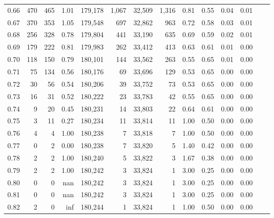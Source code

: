 \begin{tabular}{rrrrrrrrrrrrrr}
0.66 &    470 &    465 &    1.01 &  179,178 &    1,067 &  32,509 &   1,316 &  0.81 &  0.55 &  0.04 &      0.01 \\
0.67 &    370 &    353 &    1.05 &  179,548 &      697 &  32,862 &     963 &  0.72 &  0.58 &  0.03 &      0.01 \\
0.68 &    256 &    328 &    0.78 &  179,804 &      441 &  33,190 &     635 &  0.69 &  0.59 &  0.02 &      0.01 \\
0.69 &    179 &    222 &    0.81 &  179,983 &      262 &  33,412 &     413 &  0.63 &  0.61 &  0.01 &      0.00 \\
0.70 &    118 &    150 &    0.79 &  180,101 &      144 &  33,562 &     263 &  0.55 &  0.65 &  0.01 &      0.00 \\
0.71 &     75 &    134 &    0.56 &  180,176 &       69 &  33,696 &     129 &  0.53 &  0.65 &  0.00 &      0.00 \\
0.72 &     30 &     56 &    0.54 &  180,206 &       39 &  33,752 &      73 &  0.53 &  0.65 &  0.00 &      0.00 \\
0.73 &     16 &     31 &    0.52 &  180,222 &       23 &  33,783 &      42 &  0.55 &  0.65 &  0.00 &      0.00 \\
0.74 &      9 &     20 &    0.45 &  180,231 &       14 &  33,803 &      22 &  0.64 &  0.61 &  0.00 &      0.00 \\
0.75 &      3 &     11 &    0.27 &  180,234 &       11 &  33,814 &      11 &  1.00 &  0.50 &  0.00 &      0.00 \\
0.76 &      4 &      4 &    1.00 &  180,238 &        7 &  33,818 &       7 &  1.00 &  0.50 &  0.00 &      0.00 \\
0.77 &      0 &      2 &    0.00 &  180,238 &        7 &  33,820 &       5 &  1.40 &  0.42 &  0.00 &      0.00 \\
0.78 &      2 &      2 &    1.00 &  180,240 &        5 &  33,822 &       3 &  1.67 &  0.38 &  0.00 &      0.00 \\
0.79 &      2 &      2 &    1.00 &  180,242 &        3 &  33,824 &       1 &  3.00 &  0.25 &  0.00 &      0.00 \\
0.80 &      0 &      0 &     nan &  180,242 &        3 &  33,824 &       1 &  3.00 &  0.25 &  0.00 &      0.00 \\
0.81 &      0 &      0 &     nan &  180,242 &        3 &  33,824 &       1 &  3.00 &  0.25 &  0.00 &      0.00 \\
0.82 &      2 &      0 &     inf &  180,244 &        1 &  33,824 &       1 &  1.00 &  0.50 &  0.00 &      0.00 \\

\end{tabular}

